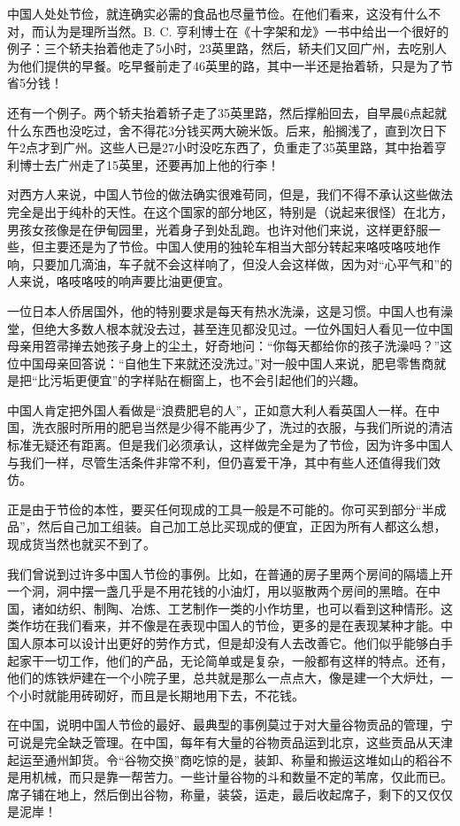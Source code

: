 \documentclass[12pt,oneside]{book}
\begin{document}
\begin{common-format}
中国人处处节俭，就连确实必需的食品也尽量节俭。在他们看来，这没有什么不对，而认为是理所当然。B. C. 亨利博士在《十字架和龙》一书中给出一个很好的例子：三个轿夫抬着他走了5小时，23英里路，然后，轿夫们又回广州，去吃别人为他们提供的早餐。吃早餐前走了46英里的路，其中一半还是抬着轿，只是为了节省5分钱！ 

还有一个例子。两个轿夫抬着轿子走了35英里路，然后撑船回去，自早晨6点起就什么东西也没吃过，舍不得花3分钱买两大碗米饭。后来，船搁浅了，直到次日下午2点才到广州。这些人已是27小时没吃东西了，负重走了35英里路，其中抬着亨利博士去广州走了15英里，还要再加上他的行李！ 

对西方人来说，中国人节俭的做法确实很难苟同，但是，我们不得不承认这些做法完全是出于纯朴的天性。在这个国家的部分地区，特别是（说起来很怪）在北方，男孩女孩像是在伊甸园里，光着身子到处乱跑。也许对他们来说，这样更舒服一些，但主要还是为了节俭。中国人使用的独轮车相当大部分转起来咯吱咯吱地作响，只要加几滴油，车子就不会这样响了，但没人会这样做，因为对“心平气和”的人来说，咯吱咯吱的响声要比油更便宜。 

一位日本人侨居国外，他的特别要求是每天有热水洗澡，这是习惯。中国人也有澡堂，但绝大多数人根本就没去过，甚至连见都没见过。一位外国妇人看见一位中国母亲用笤帚掸去她孩子身上的尘土，好奇地问：“你每天都给你的孩子洗澡吗？”这位中国母亲回答说：“自他生下来就还没洗过。”对一般中国人来说，肥皂零售商就是把“比污垢更便宜”的字样贴在橱窗上，也不会引起他们的兴趣。 

中国人肯定把外国人看做是“浪费肥皂的人”，正如意大利人看英国人一样。在中国，洗衣服时所用的肥皂当然是少得不能再少了，洗过的衣服，与我们所说的清洁标准无疑还有距离。但是我们必须承认，这样做完全是为了节俭，因为许多中国人与我们一样，尽管生活条件非常不利，但仍喜爱干净，其中有些人还值得我们效仿。 

正是由于节俭的本性，要买任何现成的工具一般是不可能的。你可买到部分“半成品”，然后自己加工组装。自己加工总比买现成的便宜，正因为所有人都这么想，现成货当然也就买不到了。 

我们曾说到过许多中国人节俭的事例。比如，在普通的房子里两个房间的隔墙上开一个洞，洞中摆一盏几乎是不用花钱的小油灯，用以驱散两个房间的黑暗。在中国，诸如纺织、制陶、冶炼、工艺制作一类的小作坊里，也可以看到这种情形。这类作坊在我们看来，并不像是在表现中国人的节俭，更多的是在表现某种才能。中国人原本可以设计出更好的劳作方式，但是却没有人去改善它。他们似乎能够白手起家干一切工作，他们的产品，无论简单或是复杂，一般都有这样的特点。还有，他们的炼铁炉建在一个小院子里，总共就是那么一点点大，像是建一个大炉灶，一个小时就能用砖砌好，而且是长期地用下去，不花钱。 

在中国，说明中国人节俭的最好、最典型的事例莫过于对大量谷物贡品的管理，宁可说是完全缺乏管理。在中国，每年有大量的谷物贡品运到北京，这些贡品从天津起运至通州卸货。令“谷物交换”商吃惊的是，装卸、称量和搬运这堆如山的稻谷不是用机械，而只是靠一帮苦力。一些计量谷物的斗和数量不定的苇席，仅此而已。席子铺在地上，然后倒出谷物，称量，装袋，运走，最后收起席子，剩下的又仅仅是泥岸！ 


\end{common-format}
\end{document}
